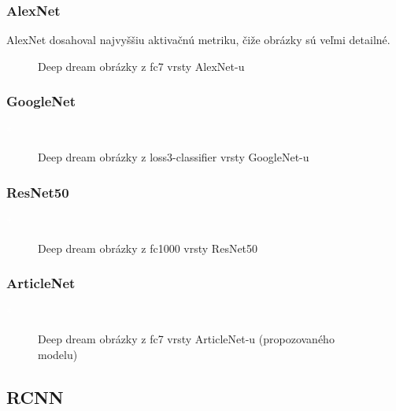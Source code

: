 \documentclass[journal,onecolumn]{IEEEtran}
\begin{document}
\subsubsection{AlexNet}
AlexNet dosahoval najvyššiu aktivačnú metriku, čiže obrázky sú veľmi detailné.
\begin{figure}[!htb]
    \centering
    \caption{Deep dream obrázky z fc7 vrsty AlexNet-u}
    \label{fig:foobar}
\end{figure}

\subsubsection{GoogleNet} \textcolor{white}{*}
\begin{figure}[!htb]
    \centering
    \caption{Deep dream obrázky z loss3-classifier vrsty GoogleNet-u}
    \label{fig:foobar}
\end{figure}

\subsubsection{ResNet50} \textcolor{white}{*}
\begin{figure}[!htb]
    \centering
    \caption{Deep dream obrázky z fc1000 vrsty ResNet50}
    \label{fig:foobar}
\end{figure}

\subsubsection{ArticleNet} \textcolor{white}{*}
\begin{figure}[!htb]
    \centering
    \caption{Deep dream obrázky z fc7 vrsty ArticleNet-u (propozovaného modelu)}
    \label{fig:foobar}
\end{figure}

\subsection{RCNN}
\end{document}
